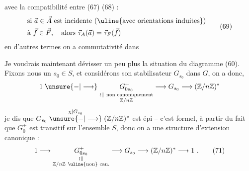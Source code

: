 avec la compatibilité entre (67) (68) :
\[
\begin{aligned}
&\text{si }\vec a\in\vec A\text{ est incidente (\uline{avec orientations induites})}\\
&\text{à }\vec f\in\vec F,\quad\text{alors }\vec\tau_A(\vec a)=\vec\tau_F(\vec f)
\end{aligned}\tag*{(69)}
\]
en d'autres termes on a commutativité dans

Je voudrais maintenant dévisser un peu plus la situation du diagramme (60). Fixons nous un $s_0\in S$, et considérons son stabilisateur  $G_{s_0}$ dans $G$, on a donc, 
\[
1\mathrel{\unsure{-|\longrightarrow}}\underset{\substack{\wr\Vert\ \text{non canoniquement}\\\mathbb Z/n\mathbb Z}}{G^+_{0s_0}}
 \longrightarrow G_{s_0}\longrightarrow(\mathbb Z/n\mathbb Z)^*
\]
je dis que $G_{s_0}\mathrel{\overset{\chi\mid G_{s_0}}{\unsure{-|\longrightarrow}}}(\mathbb Z/n\mathbb Z)^*$ est épi -- c'est formel, à partir du fait que $G_0^+$ est transitif sur l'ensemble $S$, donc on a une structure d'extension canonique :
\[
1\longrightarrow\underset{\substack{\wr\Vert\\\mathbb Z/n\mathbb Z\ \text{\uline{non} can.}}}{G^+_{0s_0}}
\longrightarrow G_{s_0}\longrightarrow(\mathbb Z/n\mathbb Z)^*\longrightarrow1\ .
\tag*{(71)}
\]
